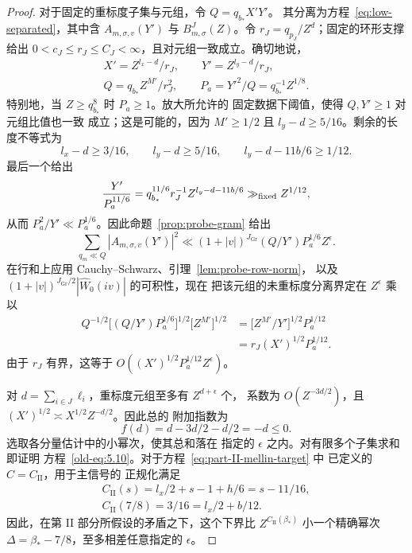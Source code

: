 \documentclass[11pt,a4paper]{article}
\numberwithin{equation}{section}
\numberwithin{figure}{section}
\theoremstyle{definition}
\theoremstyle{remark}
\begin{document}
\begin{proof}
对于固定的重标度子集与元组，令 $Q=q_{b_*}X'Y'$。
其分离为方程~\eqref{eq:low-separated}，其中含
$A_{m,\sigma,v}(Y')$ 与 $B^J_{m,\sigma}(Z)$。令
$r_J=q_{p_J}/Z^d$；固定的环形支撑给出
$0<c_J\le r_J\le C_J<\infty$，且对元组一致成立。确切地说，
\[
 \begin{gathered}
 X'=Z^{l_x-d}/r_J,\qquad Y'=Z^{l_y-d}/r_J,\\
 Q=q_{b_*}Z^{M'}/r_J^2,\qquad
 P_a=Y'^2/Q=q_{b_*}^{-1}Z^{1/8}.
 \end{gathered}
\]
特别地，当 $Z\ge q_{b_*}^8$ 时 $P_a\ge1$。放大所允许的
固定数据下阈值，使得 $Q,Y'\ge1$ 对元组比值也一致
成立；这是可能的，因为 $M'\ge1/2$ 且
$l_y-d\ge5/16$。剩余的长度不等式为
\[
 l_x-d\ge3/16,\qquad l_y-d\ge5/16,
 \qquad l_y-d-11b/6\ge1/12.
\]
最后一个给出
\[
 \frac{Y'}{P_a^{11/6}}
 =q_{b_*}^{11/6}r_J^{-1}Z^{l_y-d-11b/6}
       \gg_{\rm fixed}Z^{1/12},
\]
从而 $P_a^2/Y'\ll P_a^{1/6}$。因此命题~\ref{prop:probe-gram}
给出
\begin{equation}
 \sum_{q_m\ll Q}|A_{m,\sigma,v}(Y')|^2
 \ll (1+|v|)^{J_{\mathrm{Gr}}}(Q/Y')P_a^{1/6}Z^\epsilon.
 \label{old-eq:5.6}
\end{equation}
在行和上应用 Cauchy--Schwarz、引理~\ref{lem:probe-row-norm}，
以及 $(1+|v|)^{J_{\mathrm{Gr}}/2}|\widehat W_0(iv)|$ 的可积性，现在
把该元组的未重标度分离界定在 $Z^\epsilon$ 乘以
\[
 \begin{aligned}
 Q^{-1/2}\bigl[(Q/Y')P_a^{1/6}\bigr]^{1/2}
       \bigl[Z^{M'}\bigr]^{1/2}
 &=\bigl[Z^{M'}/Y'\bigr]^{1/2}P_a^{1/12}\\
 &=r_J(X')^{1/2}P_a^{1/12}.
 \end{aligned}
\]
由于 $r_J$ 有界，这等于
$O((X')^{1/2}P_a^{1/12}Z^\epsilon)$。

对 $d=\sum_{i\in J}\ell_i$，重标度元组至多有 $Z^{d+\epsilon}$ 个，
系数为 $O(Z^{-3d/2})$，且
$(X')^{1/2}\asymp X^{1/2}Z^{-d/2}$。因此总的
附加指数为
\begin{equation}
 f(d)=d-3d/2-d/2=-d\le0.
 \label{old-eq:5.5}
\end{equation}
选取各分量估计中的小幂次，使其总和落在
指定的 $\epsilon$ 之内。对有限多个子集求和即证明
方程~\eqref{old-eq:5.10}。对于方程~\eqref{eq:part-II-mellin-target} 中
已定义的 $C=C_{\mathrm{II}}$，用于主信号的
正规化满足
\begin{equation}
 \begin{gathered}
 C_{\mathrm{II}}(s)=l_x/2+s-1+h/6=s-11/16,\\
 C_{\mathrm{II}}(7/8)=3/16=l_x/2+b/12.
 \end{gathered}
 \label{old-eq:5.11}
\end{equation}
因此，在第 II 部分所假设的矛盾之下，这个下界比
$Z^{C_{\mathrm{II}}(\beta_*)}$ 小一个精确幂次
$\Delta=\beta_*-7/8$，至多相差任意指定的 $\epsilon$。
\end{proof}
\end{document}
